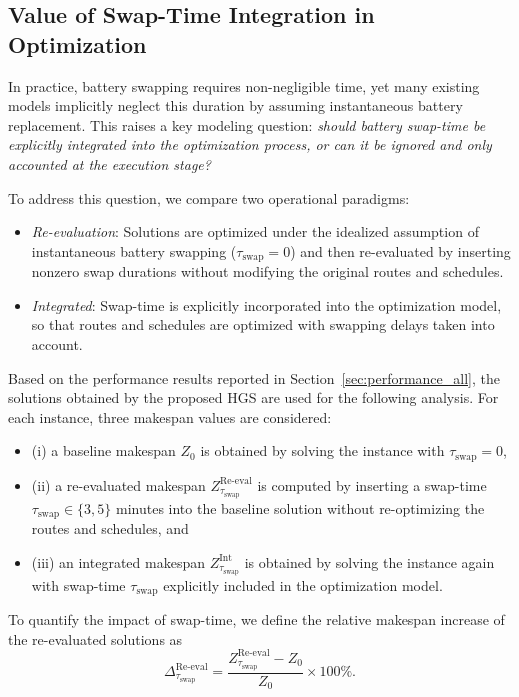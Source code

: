 \documentclass[3p, authoryear, 11pt]{elsarticle}
\begin{document}
\subsection{Value of Swap-Time Integration in Optimization}
\label{sec:value_of_swap_time_integration}

In practice, battery swapping requires non-negligible time, yet many  existing models implicitly neglect this duration by assuming instantaneous battery replacement. This raises a key modeling question:
\textit{should battery swap-time be explicitly integrated into the optimization process, or can it be ignored and only accounted at the execution stage?}

To address this question, we compare two operational paradigms:
\begin{itemize}
    \item \emph{Re-evaluation}: Solutions are optimized under the idealized assumption of instantaneous battery swapping ($\tau_{\mathrm{swap}}=0$) and then re-evaluated by inserting nonzero swap durations without modifying the original routes and schedules.
    
    \item \emph{Integrated}: Swap-time is explicitly incorporated into the optimization model, so that routes and schedules are optimized with swapping delays taken into account.

\end{itemize}

Based on the performance results reported in Section~\ref{sec:performance_all}, the solutions obtained by the proposed HGS are used for the following analysis. 
For each instance, three makespan values are considered:
\begin{itemize}
    \item (i) a baseline makespan $Z_0$ is obtained by solving the instance with $\tau_{\mathrm{swap}}=0$,
    \item (ii) a re-evaluated makespan $Z^{\text{Re-eval}}_{\tau_{\mathrm{swap}}}$ is computed by inserting a swap-time $\tau_{\mathrm{swap}} \in \{3,5\}$ minutes into the baseline solution without re-optimizing the routes and schedules, and
    \item (iii) an integrated makespan $Z^{\text{Int}}_{\tau_{\mathrm{swap}}}$ is obtained by solving the instance again with swap-time $\tau_{\mathrm{swap}}$ explicitly included in the optimization model.
\end{itemize}

To quantify the impact of swap-time, we define the relative makespan increase of the re-evaluated solutions as
\begin{equation}
\Delta^{\mathrm{Re\text{-}eval}}_{\tau_{\mathrm{swap}}}
=
\frac{Z^{\mathrm{Re\text{-}eval}}_{\tau_{\mathrm{swap}}} - Z_0}{Z_0} \times 100\%.
\end{equation}
\end{document}
